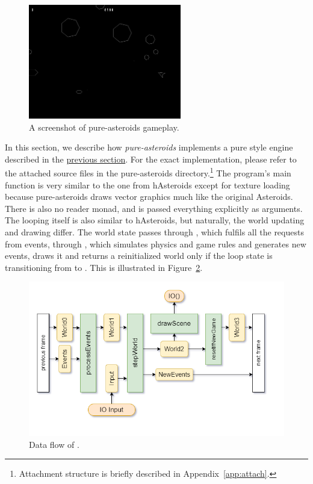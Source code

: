 \documentclass[
  digital, %
  color,   %
  table,   %
  oneside, %
  lof,     %
  lot,     %
]{fithesis3}
\begin{document}
\begin{figure}[hbt!]
    \centering
    \includegraphics[height=5cm]{images/pure-screenshot.png}
    \caption{A screenshot of pure-asteroids gameplay.}
    \label{fig:pureasteroidsscreenshot}
\end{figure}

\noindent In this section, we describe how \emph{pure-asteroids} implements a pure style engine described
in the \hyperref[sect:pureengines]{previous section}.
For the exact implementation, please refer to the attached source files
in the pure-asteroids directory.\footnote{
Attachment structure is briefly described in Appendix~\ref{app:attach}.}
The program's main function is very similar to the one from
hAsteroids except for texture loading because pure-asteroids
draws vector graphics much like the original Asteroids. There is also no reader monad,
and  is passed everything explicitly as arguments.
The looping itself is also similar to hAsteroids, but naturally,
the world updating and drawing differ. The world state passes through
, which fulfils all the requests from events,
through , which simulates physics and game rules and generates new events,
 draws it and  returns a reinitialized
world only if the loop state is transitioning from  to .
This is illustrated in Figure~\ref{fig:worldeventsflow}.
\begin{figure}
    \centering
    \includegraphics[width=\textwidth]{images/world-flow-detailed.png}
    \caption{Data flow of .}
    \label{fig:worldeventsflow}
\end{figure}
\end{document}
